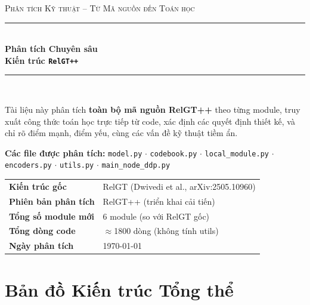 \documentclass[12pt,a4paper]{article}
\begin{document}
\begin{titlepage}
\centering\vspace*{1cm}

{\small\scshape\color{gray} Phân tích Kỹ thuật -- Từ Mã nguồn đến Toán học}\\[1em]
\rule{\textwidth}{2.5pt}\\[0.7em]
{\Huge\bfseries\color{blue!75!black} Phân tích Chuyên sâu\\[0.4em]
\Large Kiến trúc \texttt{RelGT++}
}\\[0.5em]
\rule{\textwidth}{1pt}\\[2em]

\begin{tcolorbox}[colback=blue!4,colframe=blue!50,width=0.92\textwidth,
  title={\bfseries Phạm vi phân tích},fonttitle=\bfseries]
Tài liệu này phân tích \textbf{toàn bộ mã nguồn RelGT++} theo từng module,
truy xuất công thức toán học trực tiếp từ code, xác định các quyết định
thiết kế, và chỉ rõ điểm mạnh, điểm yếu, cùng các vấn đề kỹ thuật tiềm ẩn.

\medskip
\textbf{Các file được phân tích:}
\texttt{model.py} $\cdot$ \texttt{codebook.py} $\cdot$
\texttt{local\_module.py} $\cdot$ \texttt{encoders.py} $\cdot$
\texttt{utils.py} $\cdot$ \texttt{main\_node\_ddp.py}
\end{tcolorbox}

\vspace{2em}
\begin{tabular}{lp{9cm}}
\toprule
\textbf{Kiến trúc gốc} & RelGT (Dwivedi et al., arXiv:2505.10960) \\
\textbf{Phiên bản phân tích} & RelGT++ (triển khai cải tiến) \\
\textbf{Tổng số module mới} & 6 module (so với RelGT gốc) \\
\textbf{Tổng dòng code} & $\approx$1800 dòng (không tính utils) \\
\textbf{Ngày phân tích} & \today \\
\bottomrule
\end{tabular}
\vfill
\end{titlepage}

\tableofcontents\newpage

\section{Bản đồ Kiến trúc Tổng thể}
\end{document}
